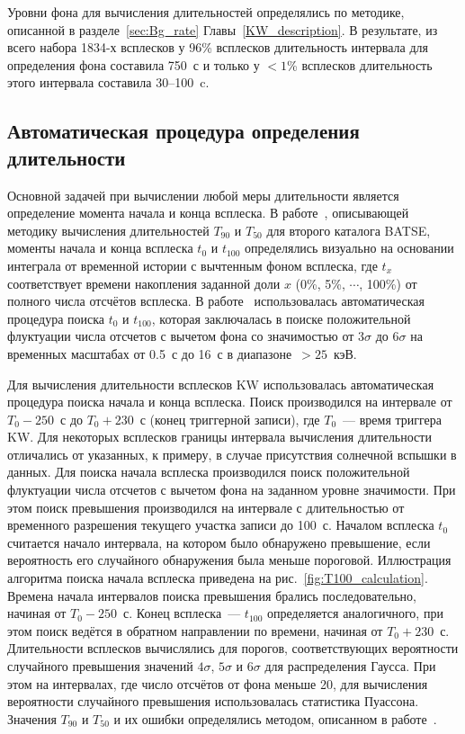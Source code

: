 Уровни фона для вычисления длительностей определялись по методике, описанной в 
разделе~\ref{sec:Bg_rate} Главы~\ref{KW_description}. 
В результате, из всего набора 1834-х всплесков у 96\% всплесков длительность 
интервала для определения фона составила 750~с и только у $<1$\% всплесков длительность этого 
интервала составила 30--100~c.

\subsection{Автоматическая процедура определения длительности}
Основной задачей при вычислении любой меры длительности является определение момента 
начала и конца всплеска. В работе~\citep{Koshut_1996}, описывающей методику вычисления 
длительностей $T_{90}$ и $T_{50}$  для второго каталога BATSE, моменты начала и 
конца всплеска $t_{0}$ и $t_{100}$ определялись визуально на основании интеграла 
от временной истории с вычтенным фоном всплеска, где $t_{x}$ соответствует времени накопления заданной 
доли $x$  (0\%, 5\%, $\cdots$, 100\%) от полного числа отсчётов всплеска. 
В работе~\citep{Bonnell_1997} использовалась автоматическая процедура поиска 
$t_{0}$ и $t_{100}$, которая заключалась в поиске положительной флуктуации числа 
отсчетов с вычетом фона со значимостью от $3\sigma$ до $6\sigma$ на временных 
масштабах от 0.5~с до 16~с в диапазоне~$>25$~кэВ.

Для вычисления длительности всплесков KW использовалась автоматическая 
процедура поиска начала и конца всплеска. Поиск производился на интервале от 
$T_0-250$~с до $T_0+230$~с (конец триггерной записи), где $T_0$~--- время триггера KW. 
Для некоторых всплесков границы интервала вычисления длительности отличались от указанных, 
к примеру, в случае присутствия солнечной вспышки в данных. Для поиска начала 
всплеска производился поиск положительной флуктуации числа отсчетов с вычетом 
фона на заданном уровне значимости. При этом поиск превышения производился на 
интервале с длительностью от временного разрешения текущего участка записи до 100~с. 
Началом всплеска $t_0$ считается начало интервала, на котором было обнаружено превышение, 
если вероятность его случайного обнаружения была меньше пороговой. 
Иллюстрация алгоритма поиска начала всплеска приведена на рис.~\ref{fig:T100_calculation}.
Времена начала интервалов поиска превышения брались последовательно, начиная от $T_0-250$~с. 
Конец всплеска~--- $t_{100}$ определяется аналогичного, при этом поиск ведётся в 
обратном направлении по времени, начиная от $T_0 + 230$~с. Длительности всплесков 
вычислялись для порогов, соответствующих вероятности случайного превышения 
значений $4\sigma$, $5\sigma$ и $6\sigma$ для распределения Гаусса. При этом на 
интервалах, где число отсчётов от фона меньше 20, для вычисления вероятности 
случайного превышения использовалась статистика Пуассона. Значения $T_{90}$ и $T_{50}$ 
и их ошибки определялись методом, описанном в работе~\citep{Koshut_1996}. 


